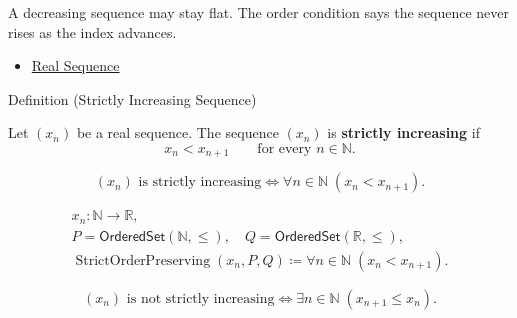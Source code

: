 \begin{remark*}[Interpretation]
A decreasing sequence may stay flat. The order condition says the sequence
never rises as the index advances.
\end{remark*}

\begin{dependencies}
\begin{itemize}
  \item \hyperref[def:real-sequence]{Real Sequence}
\end{itemize}
\end{dependencies}


\begin{definitionbox}{Definition (Strictly Increasing Sequence)}
\begin{definition}
\label{def:strictly-increasing-sequence}
Let $(x_n)$ be a real sequence. The sequence $(x_n)$ is
\textbf{strictly increasing} if
\[
  x_n < x_{n+1}
  \qquad
  \text{for every } n\in\mathbb{N}.
\]
\end{definition}
\end{definitionbox}

\begin{remark*}
\[
(x_n)\text{ is strictly increasing}
\Longleftrightarrow
\forall n\in\mathbb{N}\;(x_n<x_{n+1}).
\]
\end{remark*}

\begin{remark*}
\[
\begin{gathered}
x_n\colon\mathbb{N}\to\mathbb{R},\\
P=\mathsf{OrderedSet}(\mathbb{N},\leq),\quad
Q=\mathsf{OrderedSet}(\mathbb{R},\leq),\\
\operatorname{StrictOrderPreserving}(x_n,P,Q)
\coloneqq
\forall n\in\mathbb{N}\;(x_n<x_{n+1}).
\end{gathered}
\]
\end{remark*}

\begin{remark*}
\[
(x_n)\text{ is not strictly increasing}
\Longleftrightarrow
\exists n\in\mathbb{N}\;(x_{n+1}\le x_n).
\]
\end{remark*}


